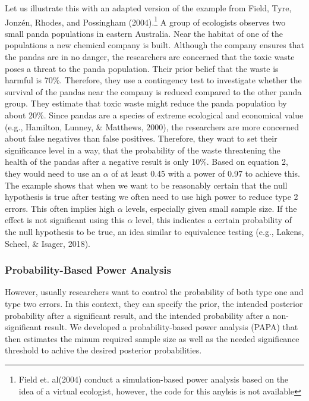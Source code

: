 \documentclass[
  english,
  ,jou,floatsintext]{apa6}
\begin{document}
Let us illustrate this with an adapted version of the example from Field, Tyre, Jonzén, Rhodes, and Possingham (2004).\footnote{Field et. al(2004) conduct a simulation-based power analysis based on the idea of a virtual ecologist, however, the code for this anylsis is not available} A group of ecologists observes two small panda populations in eastern Australia. Near the habitat of one of the populations a new chemical company is built. Although the company ensures that the pandas are in no danger, the researchers are concerned that the toxic waste poses a threat to the panda population. Their prior belief that the waste is harmful is 70\%. Therefore, they use a contingency test to investigate whether the survival of the pandas near the company is reduced compared to the other panda group. They estimate that toxic waste might reduce the panda population by about 20\%. Since pandas are a species of extreme ecological and economical value (e.g., Hamilton, Lunney, \& Matthews, 2000), the researchers are more concerned about false negatives than false positives. Therefore, they want to set their significance level in a way, that the probability of the waste threatening the health of the pandas after a negative result is only 10\%.
Based on equation 2, they would need to use an \(\alpha\) of at least 0.45 with a power of 0.97 to achieve this.
The example shows that when we want to be reasonably certain that the null hypothesis is true after testing we often need to use high power to reduce type 2 errors. This often implies high \(\alpha\) levels, especially given small sample size. If the effect is not significant using this \(\alpha\) level, this indicates a certain probability of the null hypothesis to be true, an idea similar to equivalence testing (e.g., Lakens, Scheel, \& Isager, 2018).

\hypertarget{probability-based-power-analysis}{%
\subsubsection{Probability-Based Power Analysis}\label{probability-based-power-analysis}}

However, usually researchers want to control the probability of both type one and type two errors. In this context, they can specify the prior, the intended posterior probability after a significant result, and the intended probability after a non-significant result. We developed a probability-based power analysis (PAPA) that then estimates the minum required sample size as well as the needed significance threshold to achive the desired posterior probabilities.
\end{document}
